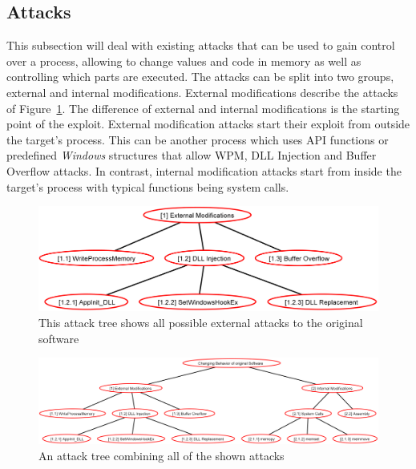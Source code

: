 \subsection{Attacks}
\label{sec:attacks}
This subsection will deal with existing attacks that can be used to gain control over a process, allowing to change values and code in memory as well as controlling which parts are executed. The attacks can be split into two groups, external and internal modifications. External modifications describe the attacks of Figure~\ref{fig:attacks_external}. The difference of external and internal modifications is the starting point of the exploit. External modification attacks start their exploit from outside the target's process. This can be another process which uses \gls{API} functions or predefined \emph{Windows} structures that allow \gls{WPM}, \gls{DLL} Injection and Buffer Overflow attacks. In contrast, internal modification attacks start from inside the target's process with typical functions being system calls.
\begin{figure}[h]
\centering
\includegraphics[width=\textwidth,keepaspectratio]{sections/adtrees/ExternalModificationsWithoutDefenses.png}
\caption{This attack tree shows all possible external attacks to the original software}
\label{fig:attacks_external}
\end{figure}






\begin{figure}[!p]
	\centering
	\includegraphics[angle=90,height=\textheight,keepaspectratio]{sections/adtrees/ProcessVirtualMemoryWithoutDefenses.png}
	\caption{An attack tree combining all of the shown attacks}
	\label{fig:attacks}
\end{figure}
